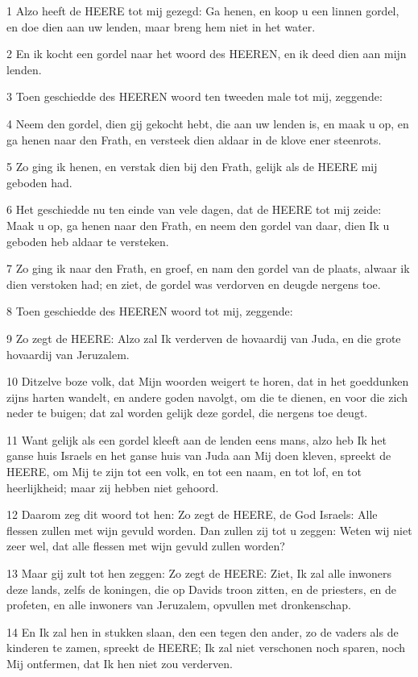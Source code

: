 \par 1 Alzo heeft de HEERE tot mij gezegd: Ga henen, en koop u een linnen gordel, en doe dien aan uw lenden, maar breng hem niet in het water.
\par 2 En ik kocht een gordel naar het woord des HEEREN, en ik deed dien aan mijn lenden.
\par 3 Toen geschiedde des HEEREN woord ten tweeden male tot mij, zeggende:
\par 4 Neem den gordel, dien gij gekocht hebt, die aan uw lenden is, en maak u op, en ga henen naar den Frath, en versteek dien aldaar in de klove ener steenrots.
\par 5 Zo ging ik henen, en verstak dien bij den Frath, gelijk als de HEERE mij geboden had.
\par 6 Het geschiedde nu ten einde van vele dagen, dat de HEERE tot mij zeide: Maak u op, ga henen naar den Frath, en neem den gordel van daar, dien Ik u geboden heb aldaar te versteken.
\par 7 Zo ging ik naar den Frath, en groef, en nam den gordel van de plaats, alwaar ik dien verstoken had; en ziet, de gordel was verdorven en deugde nergens toe.
\par 8 Toen geschiedde des HEEREN woord tot mij, zeggende:
\par 9 Zo zegt de HEERE: Alzo zal Ik verderven de hovaardij van Juda, en die grote hovaardij van Jeruzalem.
\par 10 Ditzelve boze volk, dat Mijn woorden weigert te horen, dat in het goeddunken zijns harten wandelt, en andere goden navolgt, om die te dienen, en voor die zich neder te buigen; dat zal worden gelijk deze gordel, die nergens toe deugt.
\par 11 Want gelijk als een gordel kleeft aan de lenden eens mans, alzo heb Ik het ganse huis Israels en het ganse huis van Juda aan Mij doen kleven, spreekt de HEERE, om Mij te zijn tot een volk, en tot een naam, en tot lof, en tot heerlijkheid; maar zij hebben niet gehoord.
\par 12 Daarom zeg dit woord tot hen: Zo zegt de HEERE, de God Israels: Alle flessen zullen met wijn gevuld worden. Dan zullen zij tot u zeggen: Weten wij niet zeer wel, dat alle flessen met wijn gevuld zullen worden?
\par 13 Maar gij zult tot hen zeggen: Zo zegt de HEERE: Ziet, Ik zal alle inwoners deze lands, zelfs de koningen, die op Davids troon zitten, en de priesters, en de profeten, en alle inwoners van Jeruzalem, opvullen met dronkenschap.
\par 14 En Ik zal hen in stukken slaan, den een tegen den ander, zo de vaders als de kinderen te zamen, spreekt de HEERE; Ik zal niet verschonen noch sparen, noch Mij ontfermen, dat Ik hen niet zou verderven.

